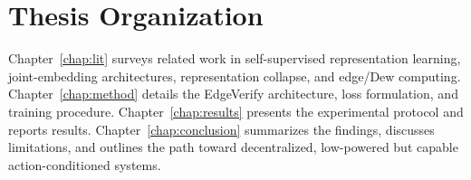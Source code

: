 \section{Thesis Organization}
Chapter~\ref{chap:lit} surveys related work in self-supervised
representation learning, joint-embedding architectures, representation
collapse, and edge/Dew computing. Chapter~\ref{chap:method} details the
EdgeVerify architecture, loss formulation, and training procedure.
Chapter~\ref{chap:results} presents the experimental protocol and reports
results. Chapter~\ref{chap:conclusion} summarizes the findings, discusses
limitations, and outlines the path toward decentralized, low-powered but
capable action-conditioned systems.
